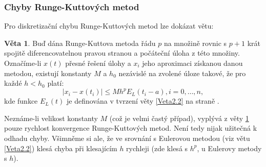 \documentclass[a4paper, 12pt]{book}
\theoremstyle{definition}
\newtheorem{theorem}{Věta}[section]
\begin{document}
\subsubsection{Chyby Runge-Kuttových metod}

Pro diskretizační chybu Runge-Kuttových metod lze dokázat větu:
\begin{theorem}\label{Veta3.2}
Buď dána Runge-Kuttova metoda řádu $p$ na množině rovnic s $p+1$ krát spojitě 
diferencovatelnou pravou stranou a počáteční úloha z této množiny. Označíme-li
$x(t)$ přesné řešení úlohy a $x_i$ jeho aproximaci získanou danou metodou, 
existují konstanty $M$ a $h_0$ nezávislé na zvolené úloze takové, že pro každé 
$h<h_0$ platí:
\begin{equation}\label{odhadRK}
|x_i-x(t_i)| \leq M h^p E_L(t_i-a), i=0,\dots,n,
\end{equation}
kde funkce $E_L(t)$ je definována v tvrzení věty \ref{Veta2.2} na straně
\pageref{Veta2.2}.
\end{theorem}

Neznáme-li velikost konstanty $M$ (což je velmi častý případ), vyplývá z věty 
\ref{Veta3.2} pouze rychlost konvergence Runge-Kuttových metod. Není tedy nijak 
užitečná k odhadu chyby. Všimněme si ale, že ve srovnání s Eulerovou metodou (viz
větu \ref{Veta2.2}) klesá chyba při klesajícím $h$ rychleji (zde klesá s $h^p$,
u Eulerovy metody s $h$).

\end{document}
